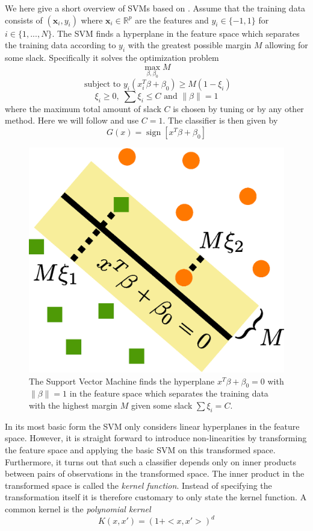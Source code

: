 \documentclass[12pt]{amsart}
\begin{document}
We here give a short overview of SVMs based on \cite{hastie2009elements}. Assume that the training data consists of $(\mathbf x_i,y_i)$ where $\mathbf x_i \in \mathbb R^p$ are the features and $y_i \in \{-1,1 \}$ for $i \in \{ 1, ..., N \}$. The SVM finds a hyperplane in the feature space which separates the training data according to $y_i$ with the greatest possible margin $M$ allowing for some slack. Specifically it solves the optimization problem
\[ \max_{\beta,\beta_0} M \]
\[ \textrm{ subject to } y_i(x_i^T \beta + \beta_0) \geq M(1- \xi_i) \]
\[ \xi_i \geq 0,\; \sum \xi_i \leq C \textrm{ and } \| \beta \| = 1 \]
where the maximum total amount of slack $C$ is chosen by tuning or by any other method. Here we will follow \cite{yamada2003statistical} and use $C=1$. The classifier is then given by
\[G(x) = \operatorname{sign} [x^T \beta + \beta_0] \]

\begin{figure}
\center
\caption{The Support Vector Machine finds the hyperplane $x^T\beta + \beta_0 = 0$ with $\| \beta \| = 1$ in the feature space which separates the training data with the highest margin $M$ given some slack $\sum \xi_i = C$.}
\includegraphics[scale=0.5]{svm.eps}
\end{figure}

In its most basic form the SVM only considers linear hyperplanes in the feature space. However, it is straight forward to introduce non-linearities by transforming the feature space and applying the basic SVM on this transformed space. Furthermore, it turns out that such a classifier depends only on inner products between pairs of observations in the transformed space. The inner product in the transformed space is called the \emph{kernel function}. Instead of specifying the transformation itself it is therefore customary to only state the kernel function. A common kernel is the \emph{polynomial kernel}
\[ K(x,x')=(1+ <x,x'> ) ^d \]
\end{document}
